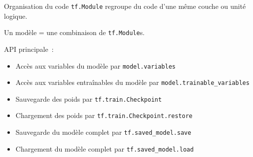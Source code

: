 \begin{frame}{Organisation du code}
  \texttt{tf.Module} regroupe du code d'une même couche ou unité logique.

  Un modèle = une combinaison de \texttt{tf.Module}s.

  API principale~:

  \begin{itemize}[<+->]
    \item Accès aux variables du modèle par \texttt{model.variables}
    \item Accès aux variables entraînables du modèle par \texttt{model.trainable\_variables}
    \item Sauvegarde des poids par \texttt{tf.train.Checkpoint}
    \item Chargement des poids par \texttt{tf.train.Checkpoint.restore}
    \item Sauvegarde du modèle complet par \texttt{tf.saved\_model.save}
    \item Chargement du modèle complet par \texttt{tf.saved\_model.load}
  \end{itemize}
\end{frame}